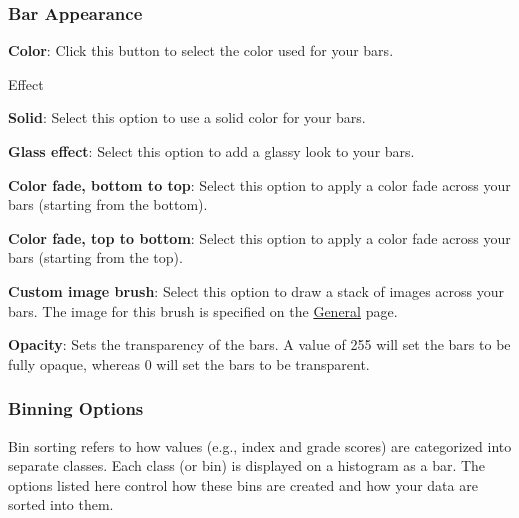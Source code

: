 \documentclass[
]{book}
\newenvironment{optionssection}
    {
    \begin{tcolorbox}[colframe=lightgray,colback=ultralightgray,sharp corners=all,parbox=false]
    }
    {
    \end{tcolorbox}
    }
\newenvironment{optionssectiontitle}
    {
    \begin{tcolorbox}[colframe=lightgray,colback=lightgray]
    \bfseries
    }
    {
    \end{tcolorbox}
    }
\theoremstyle{definition}
\theoremstyle{definition}
\theoremstyle{definition}
\theoremstyle{definition}
\theoremstyle{remark}
\begin{document}
\hypertarget{bar-appearance-1}{%
\subsubsection*{Bar Appearance}\label{bar-appearance-1}}

\textbf{Color}: Click this button to select the color used for your bars.

\begin{optionssection}

\begin{optionssectiontitle}
Effect

\end{optionssectiontitle}

\textbf{Solid}: Select this option to use a solid color for your bars.

\textbf{Glass effect}: Select this option to add a glassy look to your bars.

\textbf{Color fade, bottom to top}: Select this option to apply a color fade across your bars (starting from the bottom).

\textbf{Color fade, top to bottom}: Select this option to apply a color fade across your bars (starting from the top).

\textbf{Custom image brush}: Select this option to draw a stack of images across your bars. The image for this brush is specified on the \protect\hyperlink{options-graphs}{General} page.

\end{optionssection}

\textbf{Opacity}: Sets the transparency of the bars. A value of 255 will set the bars to be fully opaque, whereas 0 will set the bars to be transparent.

\hypertarget{binning-options}{%
\subsubsection*{Binning Options}\label{binning-options}}

Bin sorting refers to how values (e.g., index and grade scores) are categorized into separate classes. Each class (or bin) is displayed on a histogram as a bar. The options listed here control how these bins are created and how your data are sorted into them.
\end{document}
